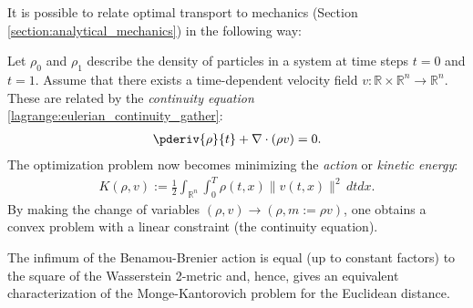     It is possible to relate optimal transport to mechanics (Section \ref{section:analytical_mechanics}) in the following way:
    \begin{method}
        Let $\rho_0$ and $\rho_1$ describe the density of particles in a system at time steps $t=0$ and $t=1$. Assume that there exists a time-dependent velocity field $v:\mathbb{R}\times\mathbb{R}^n\rightarrow\mathbb{R}^n$. These are related by the \textit{continuity equation} \ref{lagrange:eulerian_continuity_gather}:
        \begin{gather}
            \pderiv{\rho}{t} + \nabla\cdot(\rho v) = 0.
        \end{gather}
        The optimization problem now becomes minimizing the \textit{action} or \textit{kinetic energy}:
        \begin{gather}
            K(\rho,v) := \frac{1}{2}\int_{\mathbb{R}^n}\int_0^T\rho(t,x)\|v(t,x)\|^2\,dtdx.
        \end{gather}
        By making the change of variables $(\rho,v)\longrightarrow(\rho,m:=\rho v)$, one obtains a convex problem with a linear constraint (the continuity equation).
    \end{method}
    \begin{property}
        The infimum of the Benamou-Brenier action is equal (up to constant factors) to the square of the Wasserstein 2-metric and, hence, gives an equivalent characterization of the Monge-Kantorovich problem for the Euclidean distance.
    \end{property}